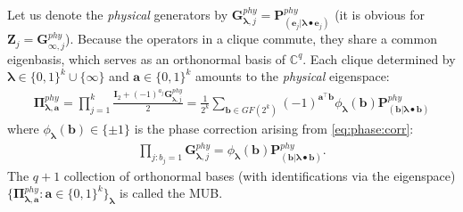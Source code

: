 \documentclass[noinfoline]{imsart}\setcounter{tocdepth}{2}
\renewcommand{\b}[1]{\mathbb{#1}} %
\newcommand{\m}[1]{\mathbf{#1}} %
\newcommand{\mb}[1]{\boldsymbol{#1}} %
\theoremstyle{plain}
\begin{document}
\begin{appendix}
Let us denote the \emph{physical} generators by $\m{G}_{\mb{\lambda}, j}^{phy} = \m{P}_{(\m{e}_{j} | \mb{\lambda} \bullet \m{e}_{j})}^{phy}$ (it is obvious for $\m{Z}_{j} = \m{G}_{\infty, j}^{phy}$). Because the operators in a clique commute, they share a common eigenbasis, which serves as an orthonormal basis of $\b{C}^{q}$. Each clique determined by $\mb{\lambda} \in \{0, 1\}^{k} \cup \{\infty\}$ and $\m{a} \in \{0, 1\}^{k}$ amounts to the \emph{physical} eigenspace:
\begin{align*}
    \m{\Pi}_{\mb{\lambda}, \m{a}}^{phy} = \prod_{j=1}^{k} \frac{\m{I}_{2} + (-1)^{a_{j}} \m{G}_{\mb{\lambda}, j}^{phy}}{2} = \frac{1}{2^{k}} \sum_{\m{b}\in GF(2^{k})} (-1)^{\m{a}^{\top}\m{b}} \phi_{\mb{\lambda}}(\m{b}) \m{P}_{(\m{b} | \mb{\lambda} \bullet \m{b})}^{phy}
\end{align*}
where $\phi_{\mb{\lambda}}(\m{b}) \in \{\pm 1\}$ is the phase correction arising from \eqref{eq:phase:corr}:
\begin{align*}
    \prod_{j: b_{j} = 1} \m{G}_{\mb{\lambda}, j}^{phy} = \phi_{\mb{\lambda}}(\m{b}) \m{P}_{(\m{b} | \mb{\lambda} \bullet \m{b})}^{phy}.
\end{align*}
The $q+1$ collection of orthonormal bases (with identifications via the eigenspace) $\{\m{\Pi}_{\mb{\lambda}, \m{a}}^{phy} : \m{a} \in \{0, 1\}^{k} \}_{\mb{\lambda}}$ is called the MUB.


\end{appendix}
\end{document}
